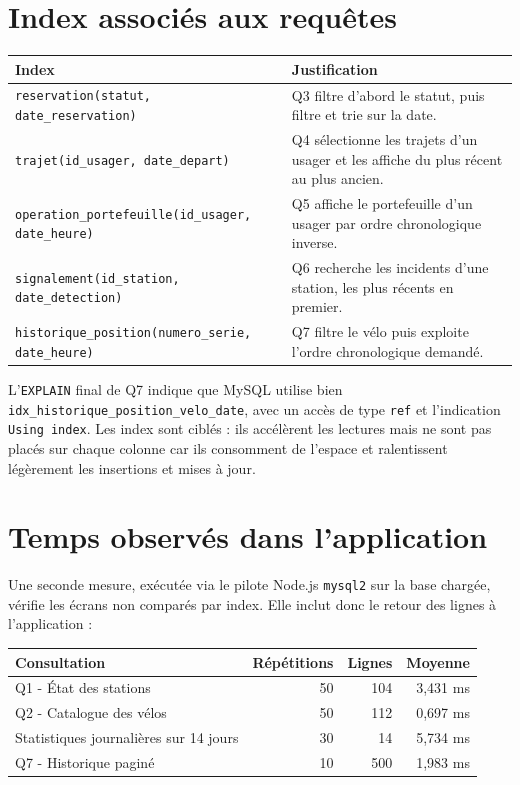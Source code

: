 \documentclass[11pt,a4paper]{article}
\begin{document}
\section{Index associés aux requêtes}
\begin{center}
\begin{tabular}{p{}p{}}
\toprule
\textbf{Index} & \textbf{Justification}\\
\midrule
\texttt{reservation(statut, date\_reservation)} & Q3 filtre d'abord le statut, puis filtre et trie sur la date.\\
\texttt{trajet(id\_usager, date\_depart)} & Q4 sélectionne les trajets d'un usager et les affiche du plus récent au plus ancien.\\
\texttt{operation\_portefeuille(id\_usager, date\_heure)} & Q5 affiche le portefeuille d'un usager par ordre chronologique inverse.\\
\texttt{signalement(id\_station, date\_detection)} & Q6 recherche les incidents d'une station, les plus récents en premier.\\
\texttt{historique\_position(numero\_serie, date\_heure)} & Q7 filtre le vélo puis exploite l'ordre chronologique demandé.\\
\bottomrule
\end{tabular}
\end{center}

L'\texttt{EXPLAIN} final de Q7 indique que MySQL utilise bien \texttt{idx\_historique\_position\_velo\_date}, avec un accès de type \texttt{ref} et l'indication \texttt{Using index}. Les index sont ciblés : ils accélèrent les lectures mais ne sont pas placés sur chaque colonne car ils consomment de l'espace et ralentissent légèrement les insertions et mises à jour.

\section{Temps observés dans l'application}
Une seconde mesure, exécutée via le pilote Node.js \texttt{mysql2} sur la base chargée, vérifie les écrans non comparés par index. Elle inclut donc le retour des lignes à l'application :
\begin{center}
\begin{tabular}{lrrr}
\toprule
\textbf{Consultation} & \textbf{Répétitions} & \textbf{Lignes} & \textbf{Moyenne}\\
\midrule
Q1 - État des stations & 50 & 104 & 3,431 ms\\
Q2 - Catalogue des vélos & 50 & 112 & 0,697 ms\\
Statistiques journalières sur 14 jours & 30 & 14 & 5,734 ms\\
Q7 - Historique paginé & 10 & 500 & 1,983 ms\\
\bottomrule
\end{tabular}
\end{center}
\end{document}
